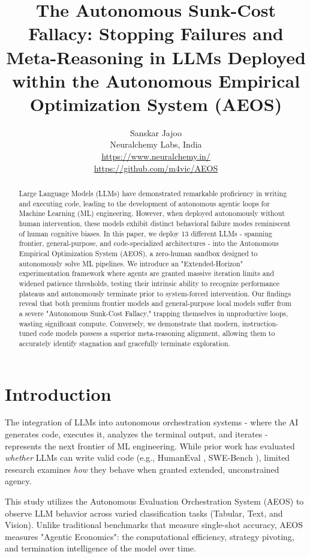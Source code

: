 \documentclass[11pt]{article}
\title{The Autonomous Sunk-Cost Fallacy: Stopping Failures and Meta-Reasoning in LLMs Deployed within the Autonomous Empirical Optimization System (AEOS)}
\author{
  Sanskar Jajoo\\
  Neuralchemy Labs, India\\
  \url{https://www.neuralchemy.in/}\\
  \url{https://github.com/m4vic/AEOS}
}
\date{}
\begin{document}
\maketitle

\begin{abstract}
Large Language Models (LLMs) have demonstrated remarkable proficiency in writing and executing code, leading to the development of autonomous agentic loops for Machine Learning (ML) engineering. However, when deployed autonomously without human intervention, these models exhibit distinct behavioral failure modes reminiscent of human cognitive biases. In this paper, we deploy 13 different LLMs - spanning frontier, general-purpose, and code-specialized architectures - into the Autonomous Empirical Optimization System (AEOS), a zero-human sandbox designed to autonomously solve ML pipelines. We introduce an "Extended-Horizon" experimentation framework where agents are granted massive iteration limits and widened patience thresholds, testing their intrinsic ability to recognize performance plateaus and autonomously terminate prior to system-forced intervention. Our findings reveal that both premium frontier models and general-purpose local models suffer from a severe "Autonomous Sunk-Cost Fallacy," trapping themselves in unproductive loops, wasting significant compute. Conversely, we demonstrate that modern, instruction-tuned code models possess a superior meta-reasoning alignment, allowing them to accurately identify stagnation and gracefully terminate exploration.
\end{abstract}

\section{Introduction}
\label{sec:intro}

The integration of LLMs into autonomous orchestration systems - where the AI generates code, executes it, analyzes the terminal output, and iterates - represents the next frontier of ML engineering. While prior work has evaluated \emph{whether} LLMs can write valid code (e.g., HumanEval \citep{chen2021evaluating}, SWE-Bench \citep{jimenez2024swebench}), limited research examines \emph{how} they behave when granted extended, unconstrained agency.

This study utilizes the Autonomous Evaluation Orchestration System (AEOS) to observe LLM behavior across varied classification tasks (Tabular, Text, and Vision). Unlike traditional benchmarks that measure single-shot accuracy, AEOS measures "Agentic Economics": the computational efficiency, strategy pivoting, and termination intelligence of the model over time.
\end{document}
